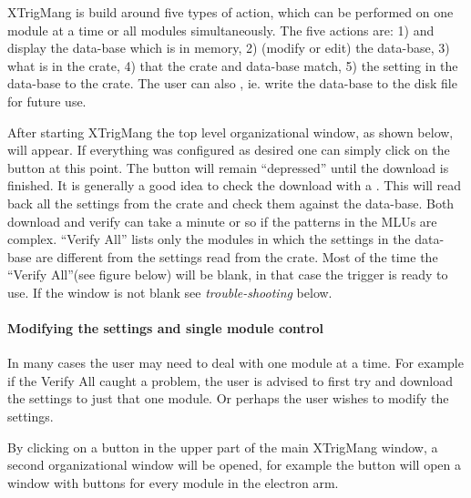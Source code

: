 	XTrigMang is build around five types of action,  which can be performed on one module at a time or all modules simultaneously.  The five actions are: 1)  and display the data-base which is in memory, 2)  (modify or edit) the data-base, 3)  what is in the crate, 4)  that the crate and data-base match, 5)  the setting in the data-base to the crate. The user can also , ie. write the data-base to the disk file for future use.

	After starting XTrigMang the top level organizational window,  as shown below, will appear.  If everything was configured as desired one can simply click on the  button at this point.  The button will remain ``depressed'' until the download is finished.  It is generally a good idea to check the download with a .  This will read back all the settings from the crate and check them against the data-base.  Both download and verify can take a minute or so if the patterns in the MLUs are complex. ``Verify All'' lists only the modules in which the settings in the data-base are different from the settings read from the crate. Most of the time the ``Verify All''(see figure below) will be blank, in that case the trigger is ready to use.  If the window is not blank see {\sl trouble-shooting} below.


	
\paragraph{Modifying the settings and single module control}

	In many cases the user may need to deal with one module at a time.  For example if the Verify All caught a problem,  the user is advised to first try and download the settings to just that one module.  Or perhaps the user wishes to modify the settings.  

	By clicking on a button in the upper part of the main XTrigMang window,  a second organizational window will be opened,  for example the  button will open a window with buttons for every module in the electron arm.
	

